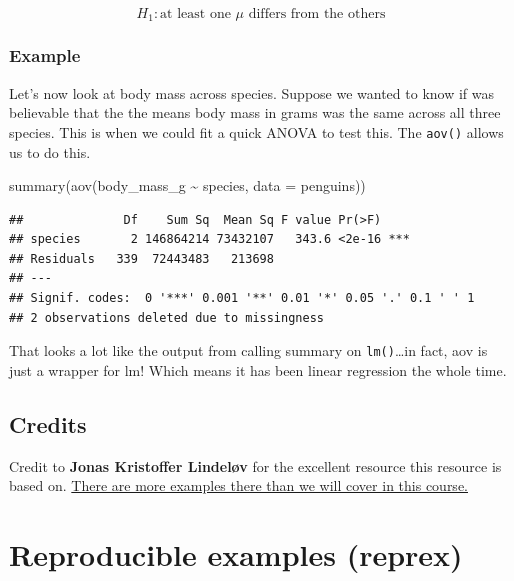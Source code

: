 \documentclass[
  openany]{book}
\newenvironment{Shaded}{\begin{snugshade}}{\end{snugshade}}
\newcommand{\AttributeTok}[1]{\textcolor[rgb]{0.77,0.63,0.00}{#1}}
\newcommand{\FunctionTok}[1]{\textcolor[rgb]{0.00,0.00,0.00}{#1}}
\newcommand{\NormalTok}[1]{#1}
\newcommand{\SpecialCharTok}[1]{\textcolor[rgb]{0.00,0.00,0.00}{#1}}
\begin{document}
\[H_1: \text{at least one }\mu \text{ differs from the others} \]

\hypertarget{example-2}{%
\subsubsection{Example}\label{example-2}}

Let's now look at body mass across species. Suppose we wanted to know if was believable that the the means body mass in grams was the same across all three species. This is when we could fit a quick ANOVA to test this. The \texttt{aov()} allows us to do this.

\begin{Shaded}
\begin{Highlighting}[]
\FunctionTok{summary}\NormalTok{(}\FunctionTok{aov}\NormalTok{(body\_mass\_g }\SpecialCharTok{\textasciitilde{}}\NormalTok{ species, }\AttributeTok{data =}\NormalTok{ penguins))}
\end{Highlighting}
\end{Shaded}

\begin{verbatim}
##              Df    Sum Sq  Mean Sq F value Pr(>F)    
## species       2 146864214 73432107   343.6 <2e-16 ***
## Residuals   339  72443483   213698                   
## ---
## Signif. codes:  0 '***' 0.001 '**' 0.01 '*' 0.05 '.' 0.1 ' ' 1
## 2 observations deleted due to missingness
\end{verbatim}

That looks a lot like the output from calling summary on \texttt{lm()}\ldots in fact, aov is just a wrapper for lm! Which means it has been linear regression the whole time.

\hypertarget{credits}{%
\subsection{Credits}\label{credits}}

Credit to \textbf{Jonas Kristoffer Lindeløv} for the excellent resource this resource is based on. \href{https://lindeloev.github.io/tests-as-linear/}{There are more examples there than we will cover in this course.}

\hypertarget{reproducible-examples-reprex}{%
\section{Reproducible examples (reprex)}\label{reproducible-examples-reprex}}
\end{document}
